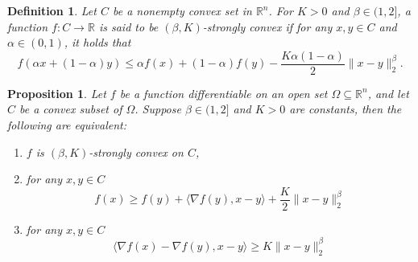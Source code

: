 \documentclass[11pt]{article}
\newtheorem{prop}[thm]{Proposition}
\newtheorem{defn}{Definition}
\begin{document}
\begin{defn}\label{def:stronglyconvex}
Let $C$ be a nonempty convex set in $\mathbb{R}^n$. For $K >0$ and $\beta \in (1, 2]$, a function $f: C \to \mathbb{R}$ is said to be $(\beta, K)$-strongly convex if for any $x, y \in C$ and $\alpha \in (0, 1)$, it holds that 
\[
f(\alpha x + (1-\alpha)y) \leq \alpha f(x) + (1-\alpha) f(y) - \frac{K\alpha(1-\alpha)}{2}\|x-y\|_2^\beta.
\]
\end{defn}

\begin{prop}\label{prop:strongly-conv-equiv}
Let $f$ be a function differentiable on an open set $\Omega \subseteq \mathbb{R}^n$, and let $C$ be a convex subset of $\Omega$. Suppose $\beta \in (1, 2]$ and $K > 0$ are constants, then the following are equivalent: 
\begin{enumerate}[label = (\roman*), ref = \theprop(\roman*)]
    \item $f$ is $(\beta, K)$-strongly convex on $C$,
    \item\label{prop:stronglyconvex} for any $x, y \in C$
    \[
    f(x) \geq f(y) + \langle \nabla f(y), x- y \rangle + \frac{K}{2}\|x-y\|_2^\beta
    \]
    \item\label{prop:stronglymonotone} for any $x, y \in C$
    \[
    \langle \nabla f (x) - \nabla f(y), x- y\rangle \geq K \|x-y\|_2^{\beta}  
    \]
\end{enumerate}
\end{prop}
\end{document}
